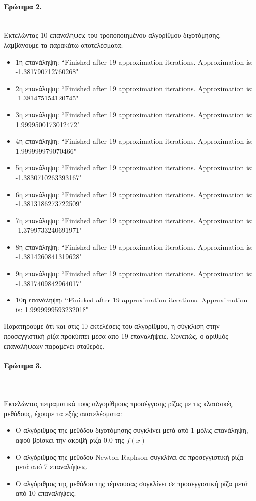 \documentclass[a4paper,11pt]{article}
\newcommand{\lt}{\latintext}
\begin{document}
\paragraph{Ερώτημα 2.}\mbox{}\\
Εκτελώντας 10 επαναλήψεις του τροποποιημένου αλγορίθμου διχοτόμησης, λαμβάνουμε τα παρακάτω αποτελέσματα:
\begin{itemize}  
\item 1η επανάληψη: {\lt ``Finished after 19 approximation iterations. Approximation is: -1.381790712760268"}
\item 2η επανάληψη: {\lt ``Finished after 19 approximation iterations. Approximation is: -1.381475154120745"}
\item 3η επανάληψη: {\lt ``Finished after 19 approximation iterations. Approximation is: 1.9999500173012472"}
\item 4η επανάληψη: {\lt ``Finished after 19 approximation iterations. Approximation is: 1.999999979070466"}
\item 5η επανάληψη: {\lt ``Finished after 19 approximation iterations. Approximation is: -1.3830710263393167"}
\item 6η επανάληψη: {\lt ``Finished after 19 approximation iterations. Approximation is: -1.3813186273722509"}
\item 7η επανάληψη: {\lt ``Finished after 19 approximation iterations. Approximation is: -1.3799733240691971"}
\item 8η επανάληψη: {\lt ``Finished after 19 approximation iterations. Approximation is: -1.3814260841319628"}
\item 9η επανάληψη: {\lt ``Finished after 19 approximation iterations. Approximation is: -1.3817409842964017"}
\item 10η επανάληψη: {\lt ``Finished after 19 approximation iterations. Approximation is: 1.9999999593232018"}
\end{itemize}	
Παρατηρούμε ότι και στις 10 εκτελέσεις του αλγορίθμου, η σύγκλιση στην προσεγγιστική ρίζα προκύπτει μέσα από 19 επαναλήψεις. Συνεπώς, ο αριθμός επαναλήψεων παραμένει σταθερός.
\paragraph{Ερώτημα 3.}\mbox{}\\
\\Εκτελώντας πειραματικά τους αλγορίθμους προσέγγισης ρίζας με τις κλασσικές μεθόδους, έχουμε τα εξής αποτελέσματα:
\begin{itemize}
\item Ο αλγόριθμος της μεθόδου διχοτόμησης συγκλίνει μετά από 1 μόλις επανάληψη, αφού βρίσκει την ακριβή ρίζα 0.0 της {\lt $f(x)$}
\item Ο αλγόριθμος της μεθοδου {\lt Newton-Raphson} συγκλίνει σε προσεγγιστική ρίζα μετά από 7 επαναλήψεις.
\item Ο αλγόριθμος της μεθόδου της τέμνουσας συγκλίνει σε προσεγγιστική ρίζα μετά από 10 επαναλήψεις.
\end{itemize}
\end{document}
